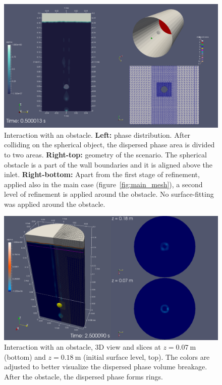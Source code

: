 \documentclass[11pt, a4paper, twoside]{article}
\begin{document}
\begin{figure}
    \centering
    \includegraphics[width=\textwidth]{figures/obstacle/obstacle}
    \caption{Interaction with an obstacle. \textbf{Left:} phase distribution. After colliding on the spherical object, the dispersed phase area is divided to two areas. \textbf{Right-top:} geometry of the scenario. The spherical obstacle is a part of the wall boundaries and it is aligned above the inlet. \textbf{Right-bottom:} Apart from the first stage of refinement, applied also in the main case (figure~\ref{fig:main_mesh}), a second level of refinement is applied around the obstacle. No surface-fitting was applied around the obstacle.}
    \label{fig:obstacle_overview}
\end{figure}

\begin{figure}
    \centering
    \includegraphics[width=\textwidth]{figures/obstacle/obstacle_3D_slices}
    \caption{Interaction with an obstacle, 3D view and slices at $z=\SI{0.07}{\metre}$ (bottom) and $z=\SI{0.18}{\metre}$ (initial surface level, top). The colors are adjusted to better visualize the dispersed phase volume breakage. After the obstacle, the dispersed phase forms rings.}
    \label{fig:obstacle_colored}
\end{figure}
\end{document}
